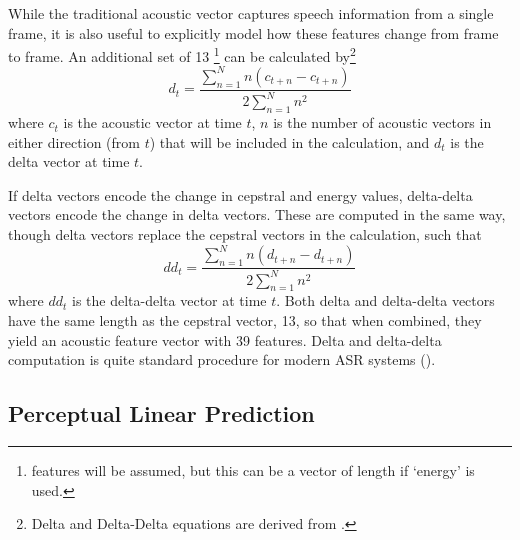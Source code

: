 While the traditional acoustic vector captures speech information from a single frame, \DIFdelbegin {}\DIFdelend it is also useful to explicitly model how these features change from frame to frame.  An additional set of 13 \DIFdelbegin {}\DIFdelend \DIFaddbegin {}\DIFaddend \footnote{\DIFdelbegin {}\DIFdelend \DIFaddbegin {} \DIFaddbegin {}\DIFaddend features will be assumed, but this can be a vector of length \DIFdelbegin {}\DIFdelend \DIFaddbegin {}\DIFaddend if `energy' is \DIFdelbegin {}\DIFdelend used.} can be calculated by\footnote{Delta and Delta-Delta equations are derived from \DIFdelbegin {}\DIFdelend \DIFaddbegin {}\DIFaddend .} \begin{equation} d_t = \dfrac{\sum_{n=1}^{N} n(c_{t+n} - c_{t+n})}{2\sum_{n=1}^{N} n^2} \end{equation} where $c_t$ is the \DIFaddbegin {}\DIFaddend acoustic vector at time $t$, $n$ is the number of acoustic vectors in either direction (from $t$) that will be included in the calculation\DIFdelbegin {}\DIFdelend , and $d_t$ is the delta vector at time $t$.  

If delta vectors encode the change in cepstral and energy values, delta-delta vectors encode the change in delta vectors.  These are computed in the same way, though delta vectors replace the cepstral vectors in the calculation, such that \begin{equation} dd_t = \dfrac{\sum_{n=1}^{N} n(d_{t+n} - d_{t+n})}{2\sum_{n=1}^{N} n^2} \end{equation} where $dd_t$ is the delta-delta vector at time $t$.  \DIFaddbegin {}\DIFaddend Both delta and delta-delta vectors have the same length as the cepstral vector, 13, so that when combined, they yield an acoustic feature vector with 39 features.  %
Delta and delta-delta computation is quite standard procedure for modern ASR systems (\cite{htk:15}).


\DIFdelbegin \subsubsection{}%
\addtocounter{subsubsection}{-1}%
\DIFdelend \DIFaddbegin \subsection{Perceptual Linear Prediction}\DIFaddend \label{sec:plp}

